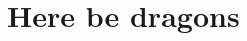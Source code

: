 \documentclass[9pt,twocolumn,twoside]{rilabRxiv}
\begin{document}
\section{Here be dragons}


\end{document}

